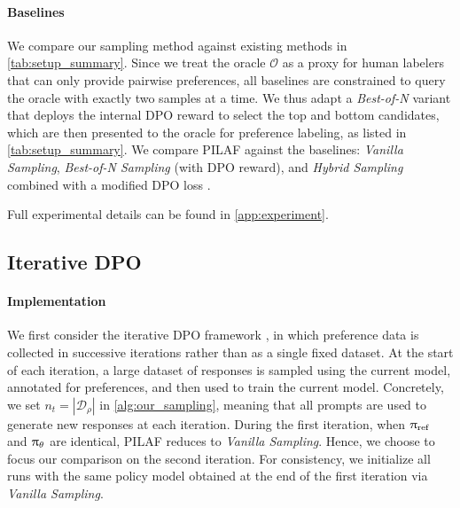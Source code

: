 
\paragraph{Baselines} We compare our sampling method against existing methods in \cref{tab:setup_summary}. Since we treat the oracle $\mathcal{O}$ as a proxy for human labelers that can only provide pairwise preferences, all baselines are constrained to query the oracle with exactly two samples at a time. We thus adapt a \textit{Best-of-N} variant that deploys the internal DPO reward to select the top and bottom candidates, which are then presented to the oracle for preference labeling, as listed in \cref{tab:setup_summary}. We compare PILAF against the baselines: \textit{Vanilla Sampling}, \textit{Best-of-N Sampling} (with DPO reward), and \textit{Hybrid Sampling} combined with a modified DPO loss \citep{xie2024exploratory}.

Full experimental details can be found in \cref{app:experiment}.

\subsection{Iterative DPO}\label{subsec:iterative_dpo}

\paragraph{Implementation} We first consider the iterative DPO framework \citep{xiong2024iterative, dong2024rlhf}, in which preference data is collected in successive iterations rather than as a single fixed dataset. At the start of each iteration, a large dataset of responses is sampled using the current model, annotated for preferences, and then used to train the current model. Concretely, we set $n_t = |\mathcal{D}_{\rho}|$ in \cref{alg:our_sampling}, meaning that all prompts are used to generate new responses at each iteration. During the first iteration, when $\uppi_{{\rm ref}}$ and $\uppi_{\theta}$ are identical, PILAF reduces to \textit{Vanilla Sampling}. Hence, we choose to focus our comparison on the second iteration. For consistency, we initialize all runs with the same policy model obtained at the end of the first iteration via \textit{Vanilla Sampling}. %

